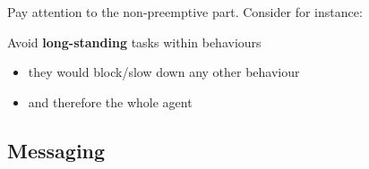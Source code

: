 \documentclass{beamer}\mode<presentation>{\usetheme{AMSCesenaPurpleAndGold}}
\begin{document}
\begin{frame}[allowframebreaks]
    \framebreak

    Pay attention to the \alert{non-preemptive} part. Consider for instance:
    

    \bigskip

    \begin{alertblock}{Avoid \textbf{long-standing} tasks within behaviours}
        \begin{itemize}
            \item they would block/slow down any other behaviour
            \item and therefore the whole agent
        \end{itemize}
    \end{alertblock}

\end{frame}

\subsection{\jade{} Messaging}
\end{document}
